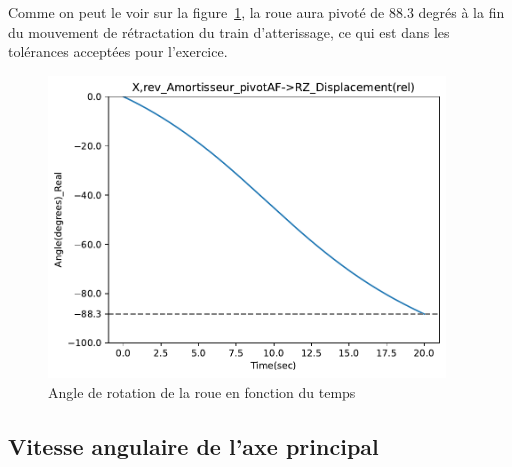 \documentclass{article}
\begin{document}
Comme on peut le voir sur la figure~\ref{fig:wheel_rotation_angle}, la roue aura pivoté de 88.3 degrés à la fin du mouvement de rétractation du train d'atterissage, ce qui est dans les tolérances acceptées pour l'exercice.
\begin{figure}[h]
    \centering 
    \includegraphics[height=8cm]{data/displacement_angle_amortisseur.pdf}
    \caption{Angle de rotation de la roue en fonction du temps}
    \label{fig:wheel_rotation_angle}
\end{figure}

\subsection{Vitesse angulaire de l'axe principal}
\end{document}
